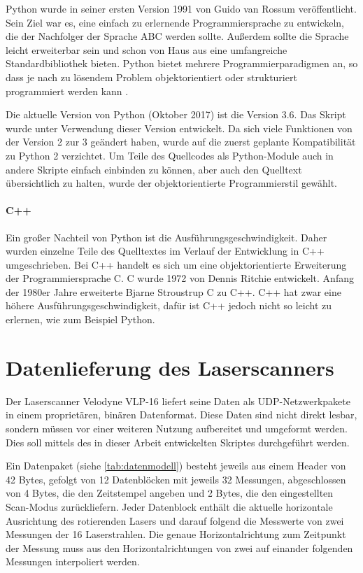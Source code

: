 \documentclass[a4paper,12pt,bibliography=totoc, listof=totoc,titlepage,pointlessnumbers]{scrreprt}
\begin{document}
Python wurde in seiner ersten Version 1991 von Guido van Rossum veröffentlicht. Sein Ziel war es, eine einfach zu erlernende Programmiersprache zu entwickeln, die der Nachfolger der Sprache ABC werden sollte. Außerdem sollte die Sprache leicht erweiterbar sein und schon von Haus aus eine umfangreiche Standardbibliothek bieten. Python bietet mehrere Programmierparadigmen an, so dass je nach zu lösendem Problem objektorientiert oder strukturiert programmiert werden kann \citep[S. 14]{python}.

Die aktuelle Version von Python (Oktober 2017) ist die Version 3.6. Das Skript wurde unter Verwendung dieser Version entwickelt. Da sich viele Funktionen von der Version 2 zur 3 geändert haben, wurde auf die zuerst geplante Kompatibilität zu Python 2 verzichtet. Um Teile des Quellcodes als Python-Module auch in andere Skripte einfach einbinden zu können, aber auch den Quelltext übersichtlich zu halten, wurde der objektorientierte Programmierstil gewählt.

\paragraph{C++}
Ein großer Nachteil von Python ist die Ausführungsgeschwindigkeit. Daher wurden einzelne Teile des Quelltextes im Verlauf der Entwicklung in C++ umgeschrieben.
Bei C++ handelt es sich um eine objektorientierte Erweiterung der Programmiersprache C. C wurde 1972 von Dennis Ritchie entwickelt. Anfang der 1980er Jahre erweiterte Bjarne Stroustrup C zu C++. C++ hat zwar eine höhere Ausführungsgeschwindigkeit, dafür ist C++ jedoch nicht so leicht zu erlernen, wie zum Beispiel Python. \citep[S. 4f]{cpp}


\section{Datenlieferung des Laser\-scan\-ners}
\label{ss:Datenlieferung}
Der Laser\-scan\-ner Velodyne VLP-16 liefert seine Daten als UDP-Netzwerkpakete in einem proprietären, binären Datenformat. Diese Daten sind nicht direkt lesbar, sondern müssen vor einer weiteren Nutzung aufbereitet und umgeformt werden. Dies soll mittels des in dieser Arbeit entwickelten Skriptes durchgeführt werden.

Ein Datenpaket (siehe \autoref{tab:datenmodell}) besteht jeweils aus einem Header von 42 Bytes, gefolgt von 12 Datenblöcken mit jeweils 32 Messungen, abgeschlossen von 4 Bytes, die den Zeitstempel angeben und 2 Bytes, die den eingestellten Scan-Modus zurückliefern. Jeder Datenblock enthält die aktuelle horizontale Ausrichtung des rotierenden Lasers und darauf folgend die Messwerte von zwei Messungen der 16 Laserstrahlen. Die genaue Horizontalrichtung zum Zeitpunkt der Messung muss aus den Horizontalrichtungen von zwei auf einander folgenden Messungen interpoliert werden.
\end{document}
